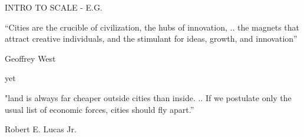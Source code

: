 \documentclass[]{beamer} %
\begin{document}
{    %

\begin{frame}{INTRO TO SCALE - E.G.}



\color{orange!50!black} %

\Large 
``Cities are the crucible of civilization, the hubs of innovation, .. the magnets that attract creative individuals, and the stimulant for ideas, growth, and innovation'' %

\vspace{-0.3cm}\hfill Geoffrey West

\hspace{4cm}yet
\vspace{.2cm}

"land is always far cheaper outside cities than inside. .. If we postulate only the usual list of economic forces, cities should fly apart.”

\hfill Robert E. Lucas Jr.

\end{frame}
} %
\end{document}

